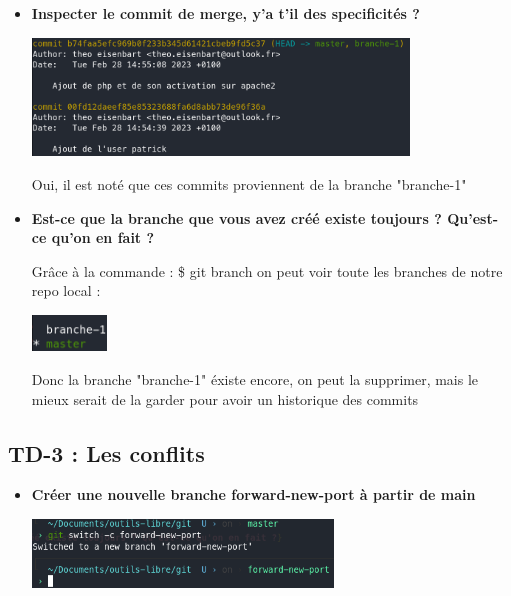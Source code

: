 \documentclass[12pt]{article}
\begin{document}
\begin{itemize}
  \item \textbf{Inspecter le commit de merge, y'a t'il des specificités ?}
  \vspace{0.3cm}

  \includegraphics[width=10cm]{images/screen-git-td2-11.png}
  \vspace{0.3cm}

  Oui, il est noté que ces commits proviennent de la branche "branche-1"
\end{itemize}
\vspace{0.3cm}

\begin{itemize}
  \item \textbf{Est-ce que la branche que vous avez créé existe toujours ? Qu'est-ce qu'on en fait ?}
  \vspace{0.3cm}

  Grâce à la commande : \newline
  \$ git branch \newline
  on peut voir toute les branches de notre repo local :
  \vspace{0.3cm}

  \includegraphics[width=2cm]{images/screen-git-td2-12.png}
  \vspace{0.3cm}

  Donc la branche "branche-1" éxiste encore, on peut la supprimer, mais le mieux serait de la garder pour avoir un
  historique des commits
\end{itemize}
\vspace{0.3cm}

  \subsection{TD-3 : Les conflits}
  \vspace{0.3cm}

\begin{itemize}
  \item \textbf{Créer une nouvelle branche forward-new-port à partir de main}
  \vspace{0.3cm}

  \includegraphics[width=8cm]{images/screen-git-td3-1.png}
\end{itemize}
\vspace{0.3cm}
\end{document}
